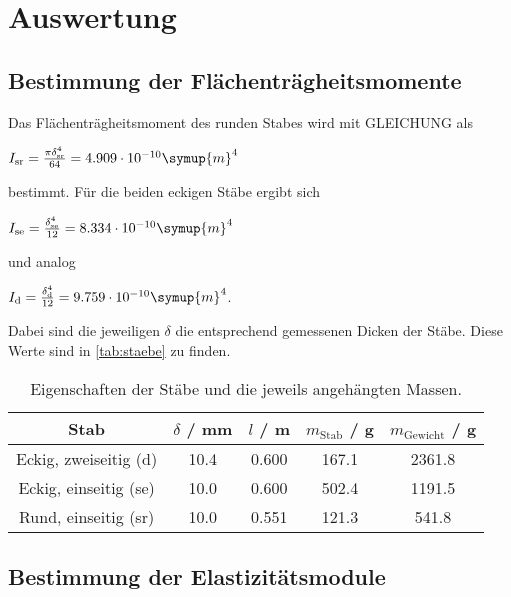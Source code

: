 \section{Auswertung}
\label{sec:Auswertung}
\subsection{Bestimmung der Flächenträgheitsmomente}
Das Flächenträgheitsmoment des runden Stabes wird mit GLEICHUNG als

\vspace{.5em}
\centerline{$I_\text{sr} = \frac{\pi \delta_\text{sr}^4}{64} = 4.909 \cdot 10^{-10} \symup{m}^4$}
\vspace{.5em}

bestimmt. Für die beiden eckigen Stäbe ergibt sich 

\vspace{.5em}
\centerline{$I_\text{se} = \frac{\delta_\text{se}^4}{12} = 8.334 \cdot 10^{-10} \symup{m}^4$}
\vspace{.5em}

und analog

\vspace{.5em}
\centerline{$I_\text{d} = \frac{\delta_\text{d}^4}{12} = 9.759 \cdot 10^{-10} \symup{m}^4$.}
\vspace{.5em}

Dabei sind die jeweiligen $\delta$ die entsprechend gemessenen Dicken der Stäbe. Diese Werte sind in \autoref{tab:staebe} zu finden.

\begin{table}[!htp]
  \centering
  \caption{Eigenschaften der Stäbe und die jeweils angehängten Massen.}
  \label{tab:staebe}
  \begin{tabular}{c S[table-format=2.1] S[table-format=1.3] S[table-format=3.1] S[table-format=4.1]}
    \toprule
    {Stab} & {$\delta$ / mm} & {$l$ / m} & {$m_\text{Stab}$ / g} & {$m_\text{Gewicht}$ / g} \\
    \midrule
    Eckig, zweiseitig (d) & 10.4 & 0.600 & 167.1 & 2361.8 \\
    Eckig, einseitig (se) & 10.0 & 0.600 & 502.4 & 1191.5 \\
    Rund, einseitig (sr)  & 10.0 & 0.551 & 121.3 &  541.8 \\
    \bottomrule
  \end{tabular}
\end{table}

\subsection{Bestimmung der Elastizitätsmodule}

